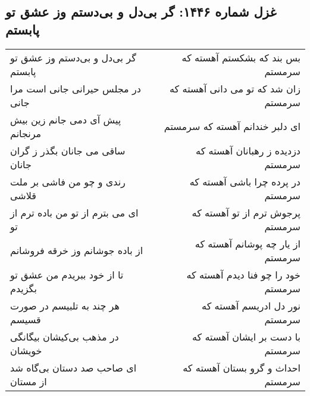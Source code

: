 \begin{center}
\section*{غزل شماره ۱۴۴۶: گر بی‌دل و بی‌دستم وز عشق تو پابستم}
\label{sec:1446}
\begin{longtable}{l p{0.5cm} r}
گر بی‌دل و بی‌دستم وز عشق تو پابستم
&&
بس بند که بشکستم آهسته که سرمستم
\\
در مجلس حیرانی جانی است مرا جانی
&&
زان شد که تو می دانی آهسته که سرمستم
\\
پیش آی دمی جانم زین بیش مرنجانم
&&
ای دلبر خندانم آهسته که سرمستم
\\
ساقی می جانان بگذر ز گران جانان
&&
دزدیده ز رهبانان آهسته که سرمستم
\\
رندی و چو من فاشی بر ملت قلاشی
&&
در پرده چرا باشی آهسته که سرمستم
\\
ای می بترم از تو من باده ترم از تو
&&
پرجوش ترم از تو آهسته که سرمستم
\\
از باده جوشانم وز خرقه فروشانم
&&
از یار چه پوشانم آهسته که سرمستم
\\
تا از خود ببریدم من عشق تو بگزیدم
&&
خود را چو فنا دیدم آهسته که سرمستم
\\
هر چند به تلبیسم در صورت قسیسم
&&
نور دل ادریسم آهسته که سرمستم
\\
در مذهب بی‌کیشان بیگانگی خویشان
&&
با دست بر ایشان آهسته که سرمستم
\\
ای صاحب صد دستان بی‌گاه شد از مستان
&&
احداث و گرو بستان آهسته که سرمستم
\\
\end{longtable}
\end{center}
